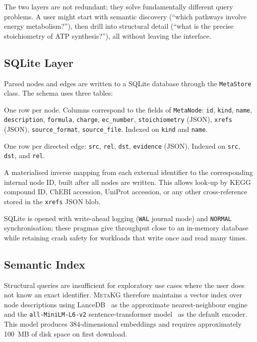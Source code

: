 \documentclass[10pt]{article}
\begin{document}
The two layers are not redundant; they solve fundamentally different query
problems. A user might start with semantic discovery (``which pathways involve
energy metabolism?''), then drill into structural detail (``what is the precise
stoichiometry of ATP synthesis?''), all without leaving the interface.

\subsection{SQLite Layer}

Parsed nodes and edges are written to a SQLite database through the
\texttt{MetaStore} class. The schema uses three tables:

\begin{description}[leftmargin=*,itemsep=2pt]
  \item[\texttt{meta\_nodes}] One row per node. Columns correspond to the
    fields of \texttt{MetaNode}: \texttt{id}, \texttt{kind}, \texttt{name},
    \texttt{description}, \texttt{formula}, \texttt{charge},
    \texttt{ec\_number}, \texttt{stoichiometry} (JSON), \texttt{xrefs}
    (JSON), \texttt{source\_format}, \texttt{source\_file}. Indexed on
    \texttt{kind} and \texttt{name}.
  \item[\texttt{meta\_edges}] One row per directed edge: \texttt{src},
    \texttt{rel}, \texttt{dst}, \texttt{evidence} (JSON). Indexed on
    \texttt{src}, \texttt{dst}, and \texttt{rel}.
  \item[\texttt{xref\_index}] A materialised inverse mapping from each
    external identifier to the corresponding internal node ID, built after
    all nodes are written. This allows look-up by KEGG compound ID, ChEBI
    accession, UniProt accession, or any other cross-reference stored in the
    \texttt{xrefs} JSON blob.
\end{description}

SQLite is opened with write-ahead logging (\texttt{WAL} journal mode) and
\texttt{NORMAL} synchronisation; these pragmas give throughput close to an
in-memory database while retaining crash safety for
workloads that write once and read many times.

\subsection{Semantic Index}

Structural queries are insufficient for exploratory use cases where the user
does not know an exact identifier. \textsc{MetaKG} therefore maintains a
vector index over node descriptions using LanceDB~\citep{lancedb2023} as the
approximate nearest-neighbour engine and the \texttt{all-MiniLM-L6-v2}
sentence-transformer model~\citep{reimers2019sbert} as the default encoder.
This model produces 384-dimensional embeddings and requires approximately
100~MB of disk space on first download.
\end{document}
